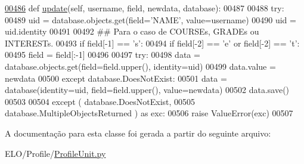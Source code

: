 \begin{DoxyCode}
\hypertarget{classProfile_1_1ProfileUnit_1_1PersProfile_l00486}{}\hyperlink{classProfile_1_1ProfileUnit_1_1PersProfile_a8c6dec48c3beb92e0250261f1dfb81df}{00486}     \textcolor{keyword}{def }\hyperlink{classProfile_1_1ProfileUnit_1_1PersProfile_a8c6dec48c3beb92e0250261f1dfb81df}{update}(self, username, field, newdata, database):
00487         
00488         \textcolor{keywordflow}{try}:
00489             uid = database.objects.get(field=\textcolor{stringliteral}{'NAME'}, value=username)
00490             uid = uid.identity
00491 
00492             \textcolor{comment}{## Para o caso de COURSEs, GRADEs ou INTERESTs.}
00493             \textcolor{keywordflow}{if} field[-1] == \textcolor{stringliteral}{'s'}:
00494                 \textcolor{keywordflow}{if} field[-2] == \textcolor{stringliteral}{'e'} \textcolor{keywordflow}{or} field[-2] == \textcolor{stringliteral}{'t'}:
00495                     field = field[:-1]
00496                 
00497             \textcolor{keywordflow}{try}:
00498                 data = database.objects.get(field=field.upper(), identity=uid)
00499                 data.value = newdata
00500             \textcolor{keywordflow}{except} database.DoesNotExist:
00501                 data = database(identity=uid, field=field.upper(), value=newdata)
00502             data.save()
00503 
00504         \textcolor{keywordflow}{except} ( database.DoesNotExist, 
00505                  database.MultipleObjectsReturned ) \textcolor{keyword}{as} exc:
00506             \textcolor{keywordflow}{raise} ValueError(exc)
00507 \end{DoxyCode}


A documentação para esta classe foi gerada a partir do seguinte arquivo\+:\begin{DoxyCompactItemize}
\item 
E\+L\+O/\+Profile/\hyperlink{ProfileUnit_8py}{Profile\+Unit.\+py}\end{DoxyCompactItemize}
